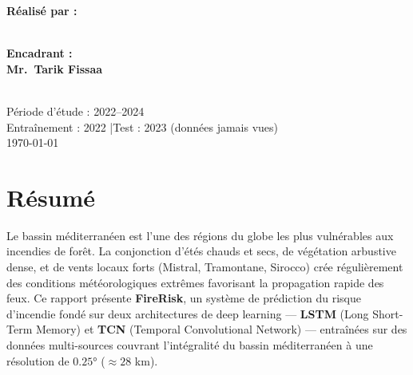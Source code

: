 \documentclass[12pt,a4paper]{report}
\begin{document}
\begin{titlepage}
\begin{center}
    {\large\color{lightGray}\textbf{Réalisé par :}}\\[0.4cm]
    \\[1cm]

    {\large\color{lightGray}\textbf{Encadrant :}}\\[0.3cm]
    {\large\bfseries\color{firePale} Mr.\ Tarik Fissaa}\\[1cm]

    \\[0.6cm]

    {\color{accentGray}
      Période d'étude : 2022–2024\\
      Entraînement : 2022 \quad|\quad Test : 2023 (données jamais vues)\\[0.8cm]
      \today}
  \end{center}
\end{titlepage}

\tableofcontents
\clearpage

\chapter*{Résumé}

\begin{firebox}[title=Résumé du projet]
Le bassin méditerranéen est l'une des régions du globe les plus vulnérables aux incendies
de forêt. La conjonction d'étés chauds et secs, de végétation arbustive dense, et de vents
locaux forts (Mistral, Tramontane, Sirocco) crée régulièrement des conditions
météorologiques extrêmes favorisant la propagation rapide des feux.
Ce rapport présente \textbf{FireRisk}, un système de prédiction du risque d'incendie
fondé sur deux architectures de deep learning — \textcolor{lstmBlue}{\textbf{LSTM}}
(Long Short-Term Memory) et \textcolor{tcnRed}{\textbf{TCN}} (Temporal Convolutional
Network) — entraînées sur des données multi-sources couvrant l'intégralité du bassin
méditerranéen à une résolution de $0.25°$ ($\approx 28$ km).
\end{firebox}
\end{document}
